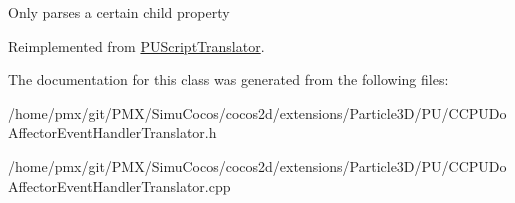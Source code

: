 Only parses a certain child property 

Reimplemented from \hyperlink{classPUScriptTranslator_a0374d83a8a04e57918975d525e0f8fe8}{P\+U\+Script\+Translator}.



The documentation for this class was generated from the following files\+:\begin{DoxyCompactItemize}
\item 
/home/pmx/git/\+P\+M\+X/\+Simu\+Cocos/cocos2d/extensions/\+Particle3\+D/\+P\+U/C\+C\+P\+U\+Do\+Affector\+Event\+Handler\+Translator.\+h\item 
/home/pmx/git/\+P\+M\+X/\+Simu\+Cocos/cocos2d/extensions/\+Particle3\+D/\+P\+U/C\+C\+P\+U\+Do\+Affector\+Event\+Handler\+Translator.\+cpp\end{DoxyCompactItemize}
